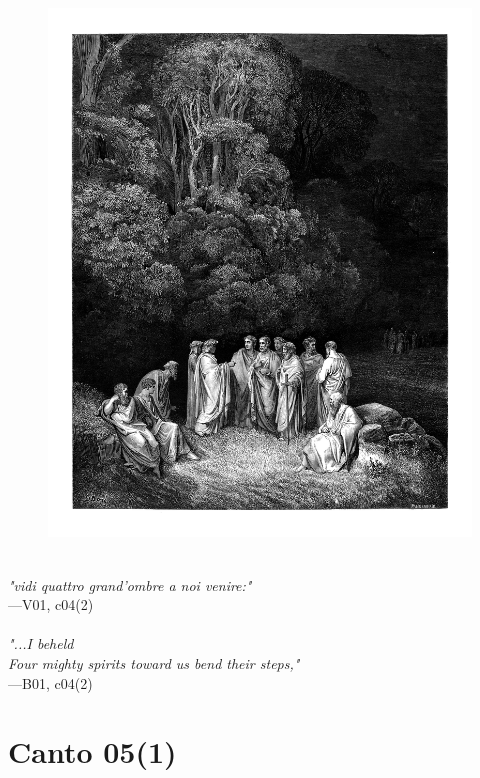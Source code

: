 \documentclass[../Dore_vision.tex]{subfiles}
\begin{document}
\begin{figure}[ht]
\centering
\includegraphics[height=\figsize]{illustrations/book_1/V01, c04(2).jpg}
\end{figure}

\begin{center}
\begin{minipage}{0.8\linewidth}
\textit{\\
"vidi quattro grand’ombre a noi venire:"} \\
—V01, c04(2) \\~\\
\textit{"...I beheld\\Four mighty spirits toward us bend their steps,"} \\
—B01, c04(2)
\end{minipage}
\end{center}

\newpage

\section{Canto 05(1)}
\end{document}
